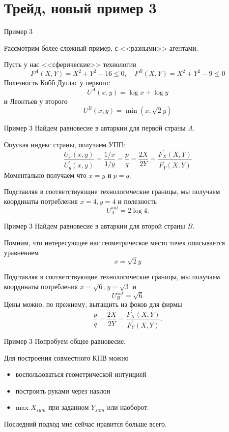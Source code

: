 \documentclass{beamer}
\begin{document}
\section{Трейд, новый пример 3}

\begin{frame}{Пример 3}

Рассмотрим более сложный пример, с <<разными>> агентами.

Пусть у нас <<сферические>> технологии
$$ F^A(X,Y) = X^2 + Y^2 - 16 \leqslant 0, \quad F^B(X,Y) = X^2 + Y^2 - 9 \leqslant 0$$
Полезность Кобб Дуглас у первого: $$U^A(x,y) = \log x + \log y$$
и Леонтьев у второго $$U^B(x,y) = \min(x, \sqrt{2} y)$$
\end{frame}

\begin{frame}{Пример 3}
Найдем равновесие в автаркии для первой страны $A$. 

Опуская индекс страны, получаем УПП:
$$ \frac{U^{'}_x(x,y)}{U^{'}_y(x,y)} = \frac{1/x}{1/y} = \frac{p}{q} = \frac{2X}{2Y} = \frac{F^{'}_X(X,Y)}{F^{'}_Y(X,Y)}$$
Моментально получаем что $x = y$ и $p = q$.

Подставляя в соответствующие технологические границы, мы получаем координаты потребления $x = 4, y = 4$ и полезность $$U^{aut}_A = 2 \log 4.$$

\end{frame}

\begin{frame}{Пример 3}
Найдем равновесие в автаркии для второй страны $B$. 

Помним, что интересующее нас геометрическое место точек описывается уравнением
$$x = \sqrt{2} y$$

Подставляя в соответствующие технологические границы, мы получаем координаты потребления $x = \sqrt{6}, y = \sqrt{3}$ и $$U^{aut}_B = \sqrt{6}$$
Цены можно, по прежнему, вытащить из фоков для фирмы
$$ \frac{p}{q} = \frac{2X}{2Y} = \frac{F^{'}_X(X,Y)}{F^{'}_Y(X,Y)}.$$
\end{frame}

\begin{frame}{Пример 3}
Попробуем общее равновесие.

Для построения совместного КПВ можно
\begin{itemize}
  \item воспользоваться геометрической интуицией
  \item построить руками через наклон
  \item max $X_{sum}$ при заданном $Y_{sum}$ или наоборот.
\end{itemize}
Последний подход мне сейчас нравится больше всего.
\end{frame}
\end{document}
